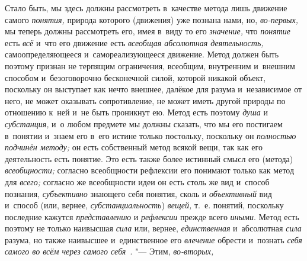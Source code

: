 Стало быть, мы здесь должны рассмотреть в~качестве метода лишь
движение самого {\em понятия,}
природа которого (движения) уже познана нами, но,
{\em во-первых,} мы
теперь должны рассмотреть его, имея в~виду то его
{\em значение,} что
{\em понятие} есть
{\em всё} и~что его
движение есть {\em всеобщая абсолютная
деятельность,} самоопределяющееся и~самореализующееся
движение. Метод должен быть поэтому признан не терпящим ограничения,
всеобщим, внутренним и~внешним способом и~безоговорочно бесконечной силой,
которой никакой объект, поскольку он выступает как нечто внешнее, далёкое
для разума и~независимое от него, не может оказывать сопротивление, не
может иметь другой природы по отношению к~ней и~не быть проникнут ею. Метод
есть поэтому {\em душа} и {\em субстанция,} и~о любом предмете мы должны
сказать, что мы его постигаем в~понятии и~знаем его в~его истине только
постольку, поскольку он {\em полностью подчинён методу;} он есть собственный
метод всякой вещи, так как его деятельность есть понятие. Это есть также более
истинный смысл его (метода) {\em всеобщности;} согласно всеобщности рефлексии
его понимают только как метод для {\em всего;} согласно же всеобщности идеи он
есть столь же вид и~способ познания, {\em субъективно} знающего себя понятия,
сколь и {\em объективный} вид и~способ (или, вернее, {\em субстанциальность})
{\em вещей,} т.~е. понятий, поскольку последние кажутся {\em представлению}
и {\em рефлексии} прежде всего {\em иными}. Метод есть поэтому не только
наивысшая {\em сила} или, вернее, {\em единственная} и~абсолютная {\em сила}
разума, но также наивысшее и~единственное его {\em влечение} обрести и~познать
{\em себя самого во всём через самого себя~}. "--- Этим, {\em во-вторых,}
